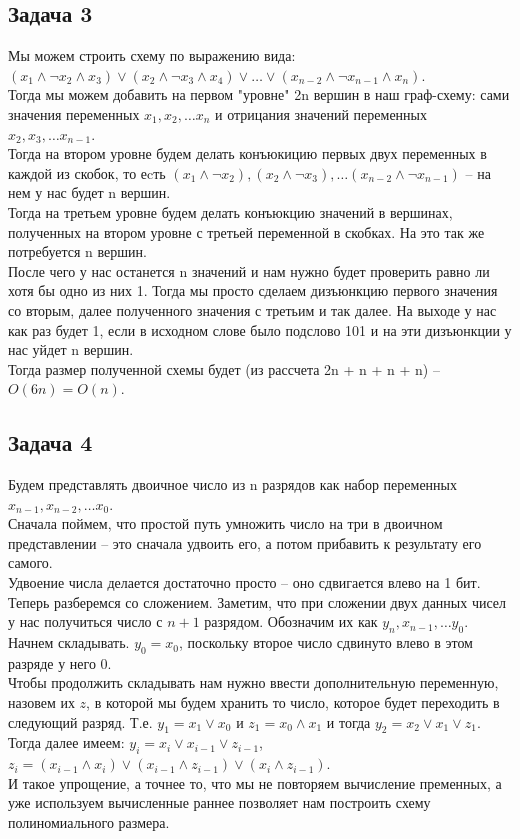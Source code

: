 	\subsection{Задача 3}
	Мы можем строить схему по выражению вида: $(x_1 \land \lnot x_2 \land x_3) \lor (x_2 \land \lnot x_3 \land x_4) \lor \ldots \lor (x_{n-2} \land \lnot x_{n-1} \land x_n)$. \\
	Тогда мы можем добавить на первом "уровне" 2n вершин в наш граф-схему: сами значения переменных $x_1, x_2, \ldots x_n$ и отрицания значений переменных $x_2, x_3, \ldots x_{n-1}$. \\
	Тогда на втором уровне будем делать конъюкицию первых двух переменных в каждой из скобок, то еcть $(x_1 \land \lnot x_2), (x_2 \land \lnot x_3), \ldots (x_{n-2} \land \lnot x_{n-1})$ -- на нем у нас будет n вершин. \\
	Тогда на третьем уровне будем делать конъюкцию значений в вершинах, полученных на втором уровне с третьей переменной в скобках. На это так же потребуется n вершин. \\
	После чего у нас останется n значений и нам нужно будет проверить равно ли хотя бы одно из них 1. Тогда мы просто сделаем дизъюнкцию первого значения со вторым, далее полученного значения с третьим и так далее. На выходе у нас как раз будет 1, если в исходном слове было подслово 101 и на эти дизъюнкции у нас уйдет n вершин. \\
	Тогда размер полученной схемы будет (из рассчета 2n + n + n + n) -- $O(6n) = O(n)$.  
	
	\subsection{Задача 4}
	Будем представлять двоичное число из n разрядов как набор переменных $x_{n-1}, x_{n-2}, \ldots x_0$. \\
	Сначала поймем, что простой путь умножить число на три в двоичном представлении -- это сначала удвоить его, а потом прибавить к результату его самого. \\
	Удвоение числа делается достаточно просто -- оно сдвигается влево на 1 бит. \\
	Теперь разберемся со сложением. Заметим, что при сложении двух данных чисел у нас получиться число с $n+1$ разрядом. Обозначим их как $y_{n}, x_{n-1}, \ldots y_0$. \\
	Начнем складывать. $y_0 = x_0$, поскольку второе число сдвинуто влево в этом разряде у него 0. \\
	Чтобы продолжить складывать нам нужно ввести дополнительную переменную, назовем их $z$, в которой мы будем хранить то число, которое будет переходить в следующий разряд. Т.е. $y_1 = x_1 \lor x_0$ и $z_1 = x_0 \land x_1$ и тогда $y_2 = x_2 \lor x_1 \lor z_1$. \\
	Тогда далее имеем: $y_i = x_i \lor x_{i-1} \lor z_{i-1}$,\\ $z_i = (x_{i-1} \land x_{i}) \lor (x_{i-1} \land z_{i-1}) \lor (x_{i} \land z_{i-1})$. \\
	И такое упрощение, а точнее то, что мы не повторяем вычисление пременных, а уже используем вычисленные раннее позволяет нам построить схему полиномиального размера. 
		
